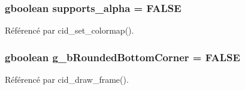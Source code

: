 \subsubsection{\setlength{\rightskip}{0pt plus 5cm}gboolean {\bf supports\_\-alpha} = FALSE}\label{cid-main_8c_9ce0ebdeaa69f3de5f586c6428c5388c}




Référencé par cid\_\-set\_\-colormap().
\subsubsection{\setlength{\rightskip}{0pt plus 5cm}gboolean {\bf g\_\-bRoundedBottomCorner} = FALSE}\label{cid-main_8c_eff7098546eeea81c9c29a272527cbdb}




Référencé par cid\_\-draw\_\-frame().